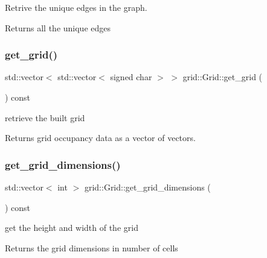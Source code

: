 Retrive the unique edges in the graph. 

\begin{DoxyReturn}{Returns}
all the unique edges 
\end{DoxyReturn}
\mbox{\label{classgrid_1_1Grid_a9efaa72e19c8351e1979c6ac18517de4}} 
\subsubsection{\texorpdfstring{get\+\_\+grid()}{get\_grid()}}
{\footnotesize\ttfamily std\+::vector$<$ std\+::vector$<$ signed char $>$ $>$ grid\+::\+Grid\+::get\+\_\+grid (\begin{DoxyParamCaption}{ }\end{DoxyParamCaption}) const}



retrieve the built grid 

\begin{DoxyReturn}{Returns}
grid occupancy data as a vector of vectors. 
\end{DoxyReturn}
\mbox{\label{classgrid_1_1Grid_ab5da2712457e615bb12ca6d5fc1f1b9d}} 
\subsubsection{\texorpdfstring{get\+\_\+grid\+\_\+dimensions()}{get\_grid\_dimensions()}}
{\footnotesize\ttfamily std\+::vector$<$ int $>$ grid\+::\+Grid\+::get\+\_\+grid\+\_\+dimensions (\begin{DoxyParamCaption}{ }\end{DoxyParamCaption}) const}



get the height and width of the grid 

\begin{DoxyReturn}{Returns}
the grid dimensions in number of cells 
\end{DoxyReturn}
\mbox{\label{classgrid_1_1Grid_a7c05ad9408e0ff99e36a3196136f3bb7}} 
